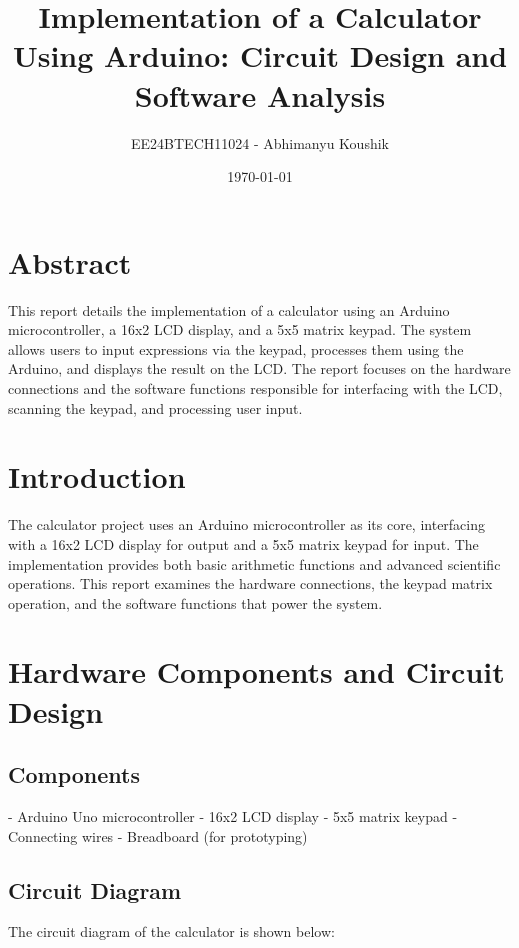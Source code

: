 \documentclass[12pt]{article}
\title{Implementation of a Calculator Using Arduino: Circuit Design and Software Analysis}
\author{EE24BTECH11024 - Abhimanyu Koushik}
\date{\today}
\begin{document}
\maketitle

\section*{Abstract}
This report details the implementation of a calculator using an Arduino microcontroller, a 16x2 LCD display, and a 5x5 matrix keypad. The system allows users to input expressions via the keypad, processes them using the Arduino, and displays the result on the LCD. The report focuses on the hardware connections and the software functions responsible for interfacing with the LCD, scanning the keypad, and processing user input.

\section{Introduction}
The calculator project uses an Arduino microcontroller as its core, interfacing with a 16x2 LCD display for output and a 5x5 matrix keypad for input. The implementation provides both basic arithmetic functions and advanced scientific operations. This report examines the hardware connections, the keypad matrix operation, and the software functions that power the system.

\section{Hardware Components and Circuit Design}

\subsection*{Components}
- Arduino Uno microcontroller\newline
- 16x2 LCD display\newline
- 5x5 matrix keypad\newline
- Connecting wires\newline
- Breadboard (for prototyping)

\subsection*{Circuit Diagram}
The circuit diagram of the calculator is shown below:
\end{document}
